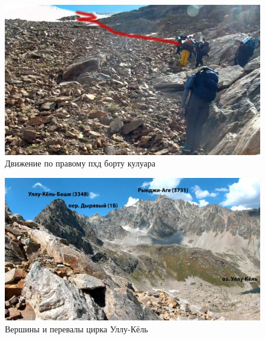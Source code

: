 \begin{figure}[h!]
	\centering
	\includegraphics[width=0.7\linewidth]{../pics/20aug3.jpg}
	\caption{Движение по правому пхд борту кулуара}
	\label{fig:20aug3.jpg}
\end{figure}

\begin{figure}[h!]
	\centering
	\includegraphics[width=0.7\linewidth]{../pics/20aug4.jpg}
	\caption{Вершины и перевалы цирка Уллу-Кёль}
	\label{fig:20aug4.jpg}
\end{figure}




